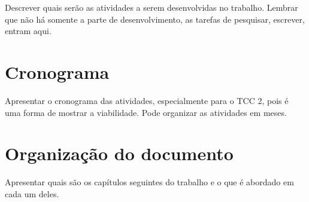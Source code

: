 Descrever quais serão as atividades a serem desenvolvidas no trabalho. Lembrar que não há somente a parte de desenvolvimento, as tarefas de pesquisar, escrever, entram aqui.

\section{Cronograma}

Apresentar o cronograma das atividades, especialmente para o TCC 2, pois é uma forma de mostrar a viabilidade. Pode organizar as atividades em meses.

\section{Organização do documento}

Apresentar quais são os capítulos seguintes do trabalho e o que é abordado em cada um deles.